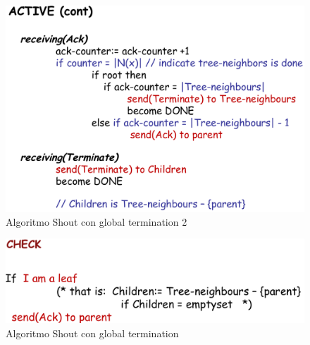 \documentclass[12pt]{article}
\begin{document}
			\begin{figure}[h!]
				\centering
				\includegraphics[scale=0.30]{img/shoutterm2.png}
				\caption{Algoritmo Shout con global termination 2}
			\end{figure}
			\begin{figure}[h!]
				\centering
				\includegraphics[scale=0.30]{img/shoutterm3.png}
				\caption{Algoritmo Shout con global termination}
			\end{figure}
		\newpage
		
\end{document}
